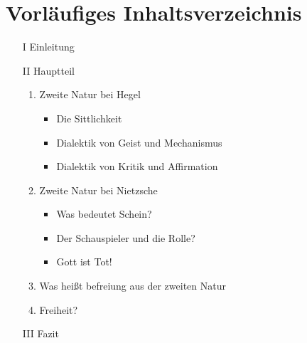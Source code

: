 \documentclass[a4paper, 12pt]{article}
\begin{document}
\section{Vorläufiges Inhaltsverzeichnis}
\begin{itemize}
    \item[I] Einleitung

    \item[II] Hauptteil
    \begin{enumerate}
        \item Zweite Natur bei Hegel
            \begin{itemize}
                \item Die Sittlichkeit
                \item Dialektik von Geist und Mechanismus
                \item Dialektik von Kritik und Affirmation
            \end{itemize}
        \item Zweite Natur bei Nietzsche
            \begin{itemize}
                \item Was bedeutet Schein?
                \item Der Schauspieler und die Rolle?
                \item Gott ist Tot!
            \end{itemize}
        \item Was heißt befreiung aus der zweiten Natur
        \item Freiheit?
    \end{enumerate}
    
    \item[III] Fazit
\end{itemize}

    
\printbibliography
 
\end{document}

